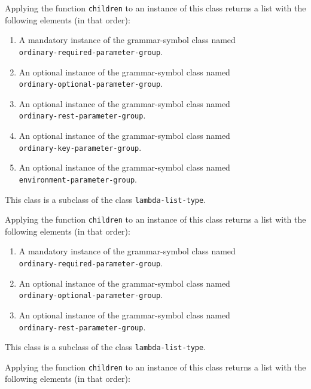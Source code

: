 
Applying the function \texttt{children} to an instance of this class
returns a list with the following elements (in that order):

\begin{enumerate}
\item A mandatory instance of the grammar-symbol class named\\
  \texttt{ordinary-required-parameter-group}.
\item An optional instance of the grammar-symbol class named\\
  \texttt{ordinary-optional-parameter-group}.
\item An optional instance of the grammar-symbol class named\\
\texttt{ordinary-rest-parameter-group}.
\item An optional instance of the grammar-symbol class named\\
\texttt{ordinary-key-parameter-group}.
\item An optional instance of the grammar-symbol class named\\
\texttt{environment-parameter-group}.
\end{enumerate}

This class is a subclass of the class \texttt{lambda-list-type}.


Applying the function \texttt{children} to an instance of this class
returns a list with the following elements (in that order):

\begin{enumerate}
\item A mandatory instance of the grammar-symbol class named\\
  \texttt{ordinary-required-parameter-group}.
\item An optional instance of the grammar-symbol class named\\
  \texttt{ordinary-optional-parameter-group}.
\item An optional instance of the grammar-symbol class named\\
\texttt{ordinary-rest-parameter-group}.
\end{enumerate}

This class is a subclass of the class \texttt{lambda-list-type}.


Applying the function \texttt{children} to an instance of this class
returns a list with the following elements (in that order):

